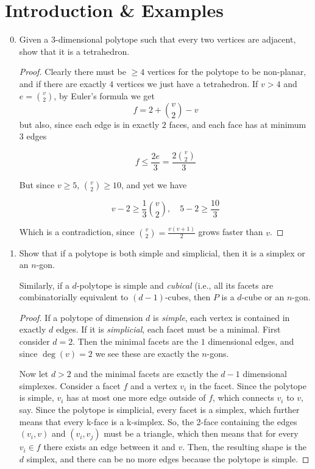 \documentclass{article}
\begin{document}
\section{Introduction \& Examples}
\begin{enumerate}
\setcounter{enumi}{-1}
\renewcommand{\labelenumi}{0.\arabic{enumi}}

\item Given a $3$-dimensional polytope such that every two vertices are
adjacent, show that it is a tetrahedron.

\begin{proof} 
    Clearly there must be $\geq 4$ vertices for the polytope to be non-planar, and if there are exactly $4$ vertices we just have a tetrahedron. If $v > 4$ and $e = \binom{v}{2}$, by Euler's formula we get
\[f = 2+\binom{v}{2}-v \]
but also, since each edge is in exactly $2$ faces, and each face has at minimum $3$ edges

\[f \leq \frac{2e}{3} = \frac{2\binom{v}{2}}{3}\]

But since $v \geq 5$, $\binom{v}{2} \geq 10$, and yet we have

\[v-2 \geq \frac{1}{3}\binom{v}{2}, \quad 5-2 \geq \frac{10}{3}\]

Which is a contradiction, since $\binom{v}{2} = \frac{v(v+1)}{2}$ grows faster than $v$.
\end{proof}


\item Show that if a polytope is both simple and simplicial, then it is a simplex or an $n$-gon.

\smallskip
Similarly, if a $d$-polytope is simple and \emph{cubical} (i.e., all its facets are
combinatorially equivalent to $(d-1)$-cubes, then $P$ is a $d$-cube or an
$n$-gon.

\begin{proof}
    If a polytope of dimension $d$ is \textit{simple}, each vertex is contained in exactly $d$ edges. If it is \textit{simplicial}, each facet must be a minimal. First consider $d = 2$. Then the minimal facets are the $1$ dimensional edges, and since $\deg(v) = 2$ we see these are exactly the $n$-gons. 
    
    Now let $d > 2$ and the minimal facets are exactly the $d-1$ dimensional simplexes. Consider a facet $f$ and a vertex $v_i$ in the facet. Since the polytope is simple, $v_i$ has at most one more edge outside of $f$, which connects $v_i$ to $v$, say. Since the polytope is simplicial, every facet is a simplex, which further means that every k-face is a k-simplex. So, the 2-face containing the edges $(v_i, v)$ and $(v_i, v_j)$ must be a triangle, which then means that for every $v_i \in f$ there exists an edge between it and $v$. Then, the resulting shape is the $d$ simplex, and there can be no more edges because the polytope is simple.



\end{proof}
\end{enumerate}
\end{document}
